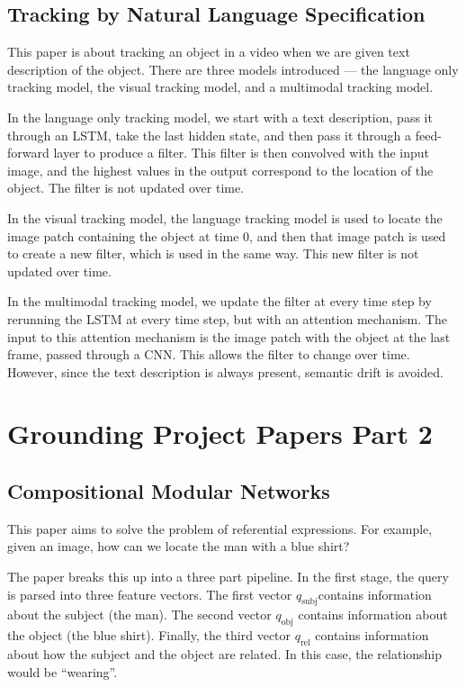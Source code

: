 \documentclass[12pt]{article}
\begin{document}
\subsection{Tracking by Natural Language Specification \cite{TrackingSpecification}}

This paper is about tracking an object in a video when we are given text description of the object. There are three models introduced — the language only tracking model, the visual tracking model, and a multimodal tracking model. 

In the language only tracking model, we start with a text description, pass it through an LSTM, take the last hidden state, and then pass it through a feed-forward layer to produce a filter. This filter is then convolved with the input image, and the highest values in the output correspond to the location of the object. The filter is not updated over time.

In the visual tracking model, the language tracking model is used to locate the image patch containing the object at time 0, and then that image patch is used to create a new filter, which is used in the same way. This new filter is not updated over time.

In the multimodal tracking model, we update the filter at every time step by rerunning the LSTM at every time step, but with an attention mechanism. The input to this attention mechanism is the image patch with the object at the last frame, passed through a CNN. This allows the filter to change over time. However, since the text description is always present, semantic drift is avoided.

\section{Grounding Project Papers Part 2}

\subsection{Compositional Modular Networks \cite{CompositionalModularNetworks}}

This paper aims to solve the problem of referential expressions. For example, given an image, how can we locate the man with a blue shirt?

The paper breaks this up into a three part pipeline. In the first stage, the query is parsed into three feature vectors. The first vector $q_\text{subj}$contains information about the subject (the man). The second vector $q_\text{obj}$ contains information about the object (the blue shirt). Finally, the third vector $q_\text{rel}$ contains information about how the subject and the object are related. In this case, the relationship would be ``wearing''.
\end{document}

